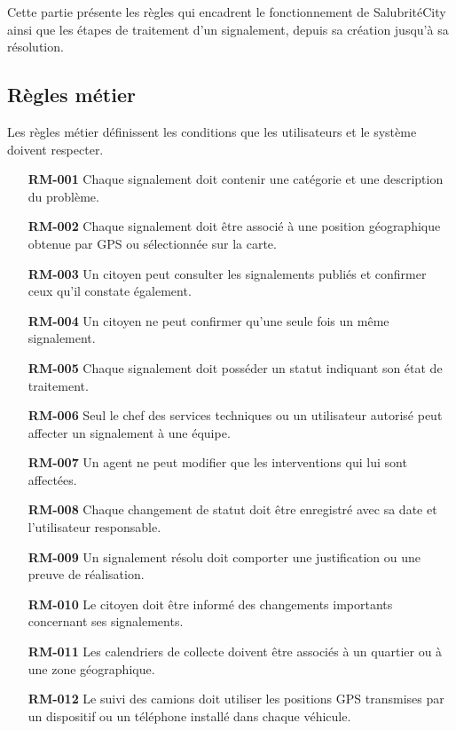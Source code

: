 \documentclass[11pt,a4paper,oneside]{report}
\begin{document}
	Cette partie présente les règles qui encadrent le fonctionnement
	de SalubritéCity ainsi que les étapes de traitement d'un
	signalement, depuis sa création jusqu'à sa résolution.
	
	\subsection{Règles métier}
	
	Les règles métier définissent les conditions que les utilisateurs
	et le système doivent respecter.
	
	\begin{enumerate}
		\item[\textbf{RM-001}] Chaque signalement doit contenir une
		catégorie et une description du problème.
		
		\item[\textbf{RM-002}] Chaque signalement doit être associé
		à une position géographique obtenue par GPS ou sélectionnée
		sur la carte.
		
		\item[\textbf{RM-003}] Un citoyen peut consulter les signalements
		publiés et confirmer ceux qu'il constate également.
		
		\item[\textbf{RM-004}] Un citoyen ne peut confirmer qu'une
		seule fois un même signalement.
		
		\item[\textbf{RM-005}] Chaque signalement doit posséder un
		statut indiquant son état de traitement.
		
		\item[\textbf{RM-006}] Seul le chef des services techniques
		ou un utilisateur autorisé peut affecter un signalement
		à une équipe.
		
		\item[\textbf{RM-007}] Un agent ne peut modifier que les
		interventions qui lui sont affectées.
		
		\item[\textbf{RM-008}] Chaque changement de statut doit être
		enregistré avec sa date et l'utilisateur responsable.
		
		\item[\textbf{RM-009}] Un signalement résolu doit comporter
		une justification ou une preuve de réalisation.
		
		\item[\textbf{RM-010}] Le citoyen doit être informé des
		changements importants concernant ses signalements.
		
		\item[\textbf{RM-011}] Les calendriers de collecte doivent
		être associés à un quartier ou à une zone géographique.
		
		\item[\textbf{RM-012}] Le suivi des camions doit utiliser
		les positions GPS transmises par un dispositif ou un
		téléphone installé dans chaque véhicule.
	\end{enumerate}
	
\end{document}
